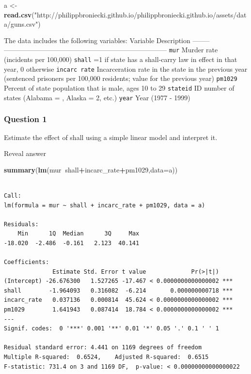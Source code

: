 \documentclass[]{article}
\newenvironment{Shaded}{\begin{snugshade}}{\end{snugshade}}
\newcommand{\KeywordTok}[1]{\textcolor[rgb]{0.13,0.29,0.53}{\textbf{#1}}}
\newcommand{\DataTypeTok}[1]{\textcolor[rgb]{0.13,0.29,0.53}{#1}}
\newcommand{\StringTok}[1]{\textcolor[rgb]{0.31,0.60,0.02}{#1}}
\newcommand{\OperatorTok}[1]{\textcolor[rgb]{0.81,0.36,0.00}{\textbf{#1}}}
\newcommand{\NormalTok}[1]{#1}
\theoremstyle{definition}
\theoremstyle{definition}
\theoremstyle{definition}
\theoremstyle{remark}
\begin{document}
\begin{Shaded}
\begin{Highlighting}[]
\NormalTok{a <-}\StringTok{ }\KeywordTok{read.csv}\NormalTok{(}\StringTok{"http://philippbroniecki.github.io/philippbroniecki.github.io/assets/data/guns.csv"}\NormalTok{)}
\end{Highlighting}
\end{Shaded}

The data includes the following variables: \textbar{}Variable\textbar{}
Description \textbar{}
\textbar{}--------\textbar{}------------------------------------------------------------------------\textbar{}
\textbar{}\texttt{mur} \textbar{} Murder rate (incidents per 100,000)
\textbar{} \textbar{}\texttt{shall} \textbar{} =1 if state has a
shall-carry law in effect in that year, 0 otherwise \textbar{}
\textbar{}\texttt{incarc\ rate} \textbar{} Incarceration rate in the
state in the previous year (sentenced prisoners per 100,000 residents;
value for the previous year) \textbar{} \textbar{}\texttt{pm1029}
\textbar{} Percent of state population that is male, ages 10 to 29
\textbar{} \textbar{}\texttt{stateid} \textbar{} ID number of states
(Alabama = , Alaska = 2, etc.) \textbar{} \textbar{}\texttt{year}
\textbar{} Year (1977 - 1999) \textbar{}

\subsubsection{Question 1}\label{question-1-1}

Estimate the effect of shall using a simple linear model and interpret
it.

 Reveal answer

\begin{Shaded}
\begin{Highlighting}[]
\KeywordTok{summary}\NormalTok{(}\KeywordTok{lm}\NormalTok{(mur}\OperatorTok{~}\NormalTok{shall}\OperatorTok{+}\NormalTok{incarc_rate}\OperatorTok{+}\NormalTok{pm1029,}\DataTypeTok{data=}\NormalTok{a))}
\end{Highlighting}
\end{Shaded}

\begin{verbatim}

Call:
lm(formula = mur ~ shall + incarc_rate + pm1029, data = a)

Residuals:
    Min      1Q  Median      3Q     Max 
-18.020  -2.486  -0.161   2.123  40.141 

Coefficients:
              Estimate Std. Error t value             Pr(>|t|)    
(Intercept) -26.676300   1.527265 -17.467 < 0.0000000000000002 ***
shall        -1.964093   0.316082  -6.214       0.000000000718 ***
incarc_rate   0.037136   0.000814  45.624 < 0.0000000000000002 ***
pm1029        1.641943   0.087414  18.784 < 0.0000000000000002 ***
---
Signif. codes:  0 '***' 0.001 '**' 0.01 '*' 0.05 '.' 0.1 ' ' 1

Residual standard error: 4.441 on 1169 degrees of freedom
Multiple R-squared:  0.6524,    Adjusted R-squared:  0.6515 
F-statistic: 731.4 on 3 and 1169 DF,  p-value: < 0.00000000000000022
\end{verbatim}
\end{document}
